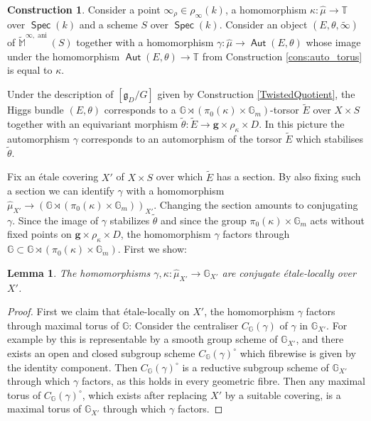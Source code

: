 \documentclass{article}
\DeclareMathOperator{\ani}{ani}
\DeclareMathOperator{\Aut}{\mathsf{Aut}}
\DeclareMathOperator{\Spec}{\mathsf{Spec}}
\newcommand{\BG}{{\mathbb{G}}}
\newcommand{\BM}{{\mathbb{M}}}
\newcommand{\BT}{{\mathbb{T}}}
\theoremstyle{definition}
\newtheorem{construction}[definition]{Construction}
\theoremstyle{plain}
\newtheorem{lemma}[definition]{Lemma}
\begin{document}
\begin{construction}  \label{ReductionCons} 
Consider a point $\infty_\rho \in \rho_\infty(k)$, a homomorphism $\kappa \colon \hat\mu \to \BT$ over $\Spec(k)$ and a scheme $S$ over $\Spec(k)$. Consider an object $(E,\theta,\tilde\infty)$ of $\widetilde\BM^{\infty,\ani}(S)$ together with a homomorphism $\gamma \colon \hat\mu \to \Aut(E,\theta)$ whose image under the homomorphism $\Aut(E,\theta) \to \BT$ from Construction \ref{cons:auto_torus} is equal to $\kappa$. 


Under the description of $[\mathfrak{g}_D/G]$ given by Construction \ref{TwistedQuotient}, the Higgs bundle $(E,\theta)$ corresponds to a $\BG\rtimes (\pi_0(\kappa) \times \BG_m)$-torsor $\tilde E$ over $X \times S$ together with an equivariant morphism $\tilde\theta\colon \tilde E \to \mathbf{g} \times \rho_\kappa\times D$. In this picture the automorphism $\gamma$ corresponds to an automorphism of the torsor $\tilde E$ which stabilises $\tilde \theta$. %

Fix an \'etale covering $X'$ of $X \times S$ over which $\tilde E$ has a section. By also fixing such a section we can identify $\gamma$ with a homomorphism $\hat\mu_{X'} \to (\BG\rtimes (\pi_0(\kappa) \times \BG_m))_{X'}$. Changing the section amounts to conjugating $\gamma$. Since the image of $\gamma$ stabilizes $\tilde \theta$ and since the group $\pi_0(\kappa)\times \BG_m$ acts without fixed points on $\mathbf{g} \times \rho_\kappa \times D$, the homomorphism $\gamma$ factors through $\BG \subset \BG\rtimes (\pi_0(\kappa) \times \BG_m)$. First we show:
  \begin{lemma}
    The homomorphisms $\gamma,\kappa \colon \hat\mu_{X'} \to \BG_{X'}$ are conjugate \'etale-locally over $X'$.
  \end{lemma}
  \begin{proof}  
 First we claim that \'etale-locally on $X'$, the homomorphism $\gamma$ factors through maximal torus of $\BG$: Consider the centraliser $C_\BG(\gamma)$ of $\gamma$ in $\BG_{X'}$. For example by \cite[Lemma 2.2.4]{MR3362641} this is representable by a smooth group scheme of $\BG_{X'}$, and there exists an open and closed subgroup scheme $C_\BG(\gamma)^\circ$ which fibrewise is given by the identity component. Then $C_\BG(\gamma)^\circ$ is a reductive subgroup scheme of $\BG_{X'}$ through which $\gamma$ factors, as this holds in every geometric fibre. Then any maximal torus of $C_\BG(\gamma)^\circ$, which exists after replacing $X'$ by a suitable covering, is a maximal torus of $\BG_{X'}$ through which $\gamma$ factors.


\end{proof}
\end{construction}
\end{document}
